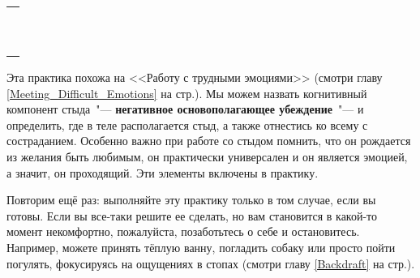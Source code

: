 \setlength{\extrarowheight}{2mm}
\begin{tabularx}{0.96\textwidth}{X}
	\\
	\arrayrulecolor{gray}\hline\\
	\hline\\
	\hline\\
	\hline\\
	\hline\\
	\hline\\	
	\hline\\
	\hline\\
	\hline\\
	\hline\\
	\hline\\
\end{tabularx}
\setlength{\extrarowheight}{0mm}


 \label{IP:Working_with_Shame}

Эта практика похожа на <<Работу с трудными эмоциями>> (смотри главу \ref{Meeting_Difficult_Emotions} на стр.\:\pageref{IP:Working_with_Difficult_Emotions}). Мы можем назвать когнитивный компонент стыда~"--- \textbf{негативное основополагающее убеждение}~"--- и определить, где в теле располагается стыд, а также отнестись ко всему с состраданием. Особенно важно при работе со стыдом помнить, что он рождается из желания быть любимым, он практически универсален и он является эмоцией, а значит, он проходящий. Эти элементы включены в практику.

Повторим ещё раз: выполняйте эту практику только в том случае, если вы готовы. Если вы все-таки решите ее сделать, но вам становится в какой-то момент некомфортно, пожалуйста, позаботьтесь о себе и остановитесь. Например, можете принять тёплую ванну, погладить собаку или просто пойти погулять, фокусируясь на ощущениях в стопах (смотри главу \ref{Backdraft} на стр.\:\pageref{IP:Feeling_the_Soles_of_Your_Feet}).

